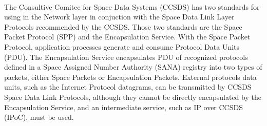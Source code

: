 \paragraph{}The Consultive Comitee for Space Data Systems (CCSDS)\cite{CCSDSOverview} has two standards for using in the Network layer in conjuction with the Space Data Link Layer Protocols recommended by the CCSDS. Those two standards are the Space Packet Protocol (SPP)\cite{SPP} and the Encapsulation Service\cite{ES}. With the Space Packet Protocol, application processes generate and consume Protocol Data Units (PDU). The Encapsulation Service encapsulates PDU of recognized protocols defined in a Space Assigned Number Authority (SANA)\cite{SANA} registry into two types of packets, either Space Packets or Encapsulation Packets. External protocols data units, such as the Internet Protocol datagrams, can be transmitted by CCSDS Space Data Link Protocols, although they cannot be directly encapsulated by the Encapsulation Service, and an intermediate service, such as IP over CCSDS (IPoC)\cite{IPoC}, must be used.
